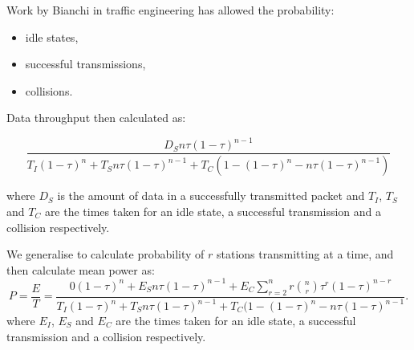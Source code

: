 \documentclass[portrait,a0b,final]{a0poster}
\newenvironment{poster}{
  \begin{center}
  \begin{minipage}[c]{0.98\textwidth}
}{
  \end{minipage} 
  \end{center}
}
\newenvironment{pcolumn}[1]{
  \begin{minipage}{#1\textwidth}
  \begin{center}
}{
  \end{center}
  \end{minipage}
}
\newcommand{\pbox}[4]{
\psshadowbox[#3]{
\begin{minipage}[t][#2][t]{#1}
#4
\end{minipage}
}}
\begin{document}
\begin{poster}
\begin{center}
\begin{pcolumn}{0.49}
{\medskip
\begin{center}\pbox{0.8\textwidth}{}{linewidth=2mm,framearc=0.1,linecolor=lightblue,fillstyle=gradient,gradangle=0,gradbegin=white,gradend=whiteblue,gradmidpoint=1.0,framesep=1em}{\begin{center}Bianchi Models\end{center}}\end{center}\vspace{1.25cm}

\smallskip

Work by Bianchi in traffic engineering has allowed the probability:

\begin{itemize}
\item idle states,
\item successful transmissions,
\item collisions.
\end{itemize}

Data throughput then calculated as:

\begin{equation}
\frac{D_S n \tau ( 1 - \tau )^{n-1}}{T_I ( 1 - \tau )^n + T_S n \tau ( 1 - \tau )^{n-1} + T_C (1-( 1 - \tau )^n-n \tau ( 1 - \tau )^{n-1})}
\end{equation}

where $D_S$ is the amount of data in a successfully transmitted
packet and $T_I$, $T_S$ and $T_C$ are the times taken for an idle state,
a successful transmission and a collision respectively.

\medskip

We generalise to calculate probability of $r$ stations transmitting
at a time, and then calculate mean power as:
\begin{equation}
P = \frac{E}{T} = \frac{0 ( 1 - \tau )^n + E_S n \tau ( 1 - \tau )^{n-1} + E_C \sum_{r = 2}^{n} r \binom{n}{r} \tau^r (1-\tau)^{n-r}}{T_I ( 1 - \tau )^n + T_S n \tau ( 1 - \tau )^{n-1} + T_C (1-( 1 - \tau )^n-n \tau ( 1 - \tau )^{n-1}}.
\end{equation}
where $E_I$, $E_S$ and $E_C$ are the times taken for an idle state,
a successful transmission and a collision respectively.



}
\end{pcolumn}
\begin{pcolumn}{0.49}
\pbox{0.9\textwidth}{28cm}{linewidth=2mm,framearc=0.1,linecolor=lightblue,fillstyle=gradient,gradangle=0,gradbegin=white,gradend=white,gradmidpoint=1.0,framesep=1em}{

}
\end{pcolumn}
\end{center}
\end{poster}
\end{document}
